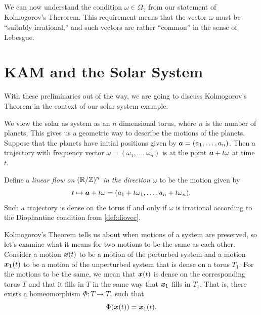 \documentclass[twoside,letterpaper,11pt]{article}
\numberwithin{equation}{section}
\begin{document}
We can now understand the condition $\omega \in \Omega_{\gamma}$ from our
statement of Kolmogorov's Therorem.
This requirement means that the vector $\omega$ must be ``suitably irrational,''
and such vectors are rather ``common'' in the sense of Lebesgue.


\section{KAM and the Solar System}
\label{sec:kam-solar-system}

With these preliminaries out of the way, we are going to discuss Kolmogorov's
Theorem in the context of our solar system example.

We view the solar as system as an $n$ dimensional torus, where $n$ is the number
of planets.
This gives us a geometric way to describe the motions of the planets.
Suppose that the planets have initial positions given by $\bm{a} = (a_1, \ldots,
a_n)$.
Then a trajectory with frequency vector $\omega = (\omega_1, \ldots, \omega_n)$
is at the point $\bm{a} + t \omega$ at time $t$.

Define a \emph{linear flow on $(\mathbb{R}/\mathbb{Z})^n$ in the direction $\omega$} to be the
motion given by
\begin{equation*}
  t \mapsto \bm{a} + t \omega = (a_1 + t \omega_1, \ldots, a_n + t \omega_n).
\end{equation*}
Such a trajectory is dense on the torus if and only if $\omega$ is irrational
according to the Diophantine condition from \cref{def:diovec}.

Kolmogorov's Theorem tells us about when motions of a system are preserved, so
let's examine what it means for two motions to be the same as each other.
Consider a motion $\bm{x}(t)$ to be a motion of the perturbed system and a
motion $\bm{x_1}(t)$ to be a motion of the unperturbed system that is dense on a
torus $T_1$.
For the motions to be the same, we mean that $\bm{x}(t)$ is dense on the
corresponding torus $T$ and that it fills in $T$ in the same way that $\bm{x}_1$
fills in $T_1$.
That is, there exists a homeomorphism $\Phi : T \to T_1$ such that
\begin{equation*}
  \Phi(\bm{x}(t)) = \bm{x}_1(t).
\end{equation*}
\end{document}
